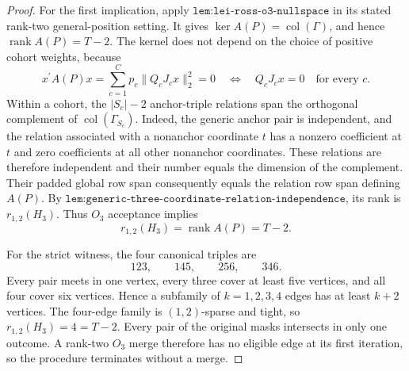 \documentclass{article}
\begin{document}
\begin{proof}
For the first implication, apply \(\texttt{lem:lei-ross-o3-nullspace}\) in its stated rank-two general-position setting. It gives \(\ker A(P)=\operatorname{col}(\Gamma)\), and hence \(\operatorname{rank}A(P)=T-2\). The kernel does not depend on the choice of positive cohort weights, because
\[
x^{\prime}A(P)x
=\sum_{c=1}^Cp_c\|Q_cJ_cx\|_2^2=0
\quad\Longleftrightarrow\quad
Q_cJ_cx=0\quad\text{for every }c.
\tag{1}
\]
Within a cohort, the \(|S_c|-2\) anchor-triple relations span the orthogonal complement of \(\operatorname{col}(\Gamma_{S_c})\). Indeed, the generic anchor pair is independent, and the relation associated with a nonanchor coordinate \(t\) has a nonzero coefficient at \(t\) and zero coefficients at all other nonanchor coordinates. These relations are therefore independent and their number equals the dimension of the complement. Their padded global row span consequently equals the relation row span defining \(A(P)\). By \(\texttt{lem:generic-three-coordinate-relation-independence}\), its rank is \(r_{1,2}(H_3)\). Thus \(O_3\) acceptance implies
\[
r_{1,2}(H_3)=\operatorname{rank}A(P)=T-2.
\tag{2}
\]

For the strict witness, the four canonical triples are
\[
123,\qquad145,\qquad256,\qquad346.
\]
Every pair meets in one vertex, every three cover at least five vertices, and all four cover six vertices. Hence a subfamily of \(k=1,2,3,4\) edges has at least \(k+2\) vertices. The four-edge family is \((1,2)\)-sparse and tight, so \(r_{1,2}(H_3)=4=T-2\). Every pair of the original masks intersects in only one outcome. A rank-two \(O_3\) merge therefore has no eligible edge at its first iteration, so the procedure terminates without a merge.


\end{proof}
\end{document}
